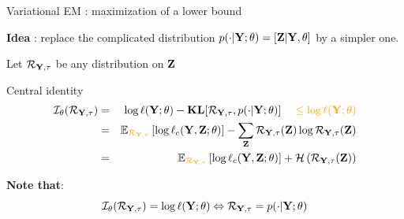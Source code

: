 \documentclass[compress,10pt]{beamer}
\begin{document}
 
 \begin{frame}{Variational EM  : maximization of a lower bound}


\textcolor{dgreen}{\textbf{Idea}} : replace the complicated distribution $p(\cdot | \mathbf{Y}; \theta) = [\mathbf{Z} | \mathbf{Y}, \theta]$ by a simpler one. 


Let $\mathcal{R}_{\mathbf{Y},\mathbf{\tau}}$ be any distribution on   $\mathbf{Z}$


\begin{block}{Central identity}
\begin{eqnarray*}
\mathcal{I}_{\theta}(\mathcal{R}_{\Xall,\btau}) &=& \log \ell(\Xall ; \theta) -   \mathbf{KL}[\mathcal{R}_{\Xall,\btau}, p(\cdot | \Xall; \theta)] \color{dgreen}\quad \leq   \log \ell(\Xall ; \theta)   \\
&=& \mathbb{E}_{\color{dgreen}\mathcal{R}_{\Xall,\btau}} \left[\log \ell_c(\bX,\bZ; \theta)   \right]  -   \sum_{\Zall} \mathcal{R}_{\Xall,\btau}(\bZ)  \log \mathcal{R}_{\Xall,\btau}({\bZ}) \\
&=& \mathbb{E}_{\color{dgreen}\mathcal{R}_{\Xall,\btau}} \left[\log \ell_c(\bX,\bZ; \theta)   \right]  +  \mathcal{H}\left(\mathcal{R}_{\Xall,\btau}(\bZ)\right) 
\end{eqnarray*}
\end{block} 

\textbf{Note that}:  
$$\mathcal{I}_{\theta}(\mathcal{R}_{\mathbf{Y},\mathbf{\tau}})  = \log \ell(\mathbf{Y}; \theta) \Leftrightarrow \mathcal{R}_{\mathbf{Y},\mathbf{\tau}} = p(\cdot | \mathbf{Y}; \theta)$$ 


\end{frame}
\end{document}
